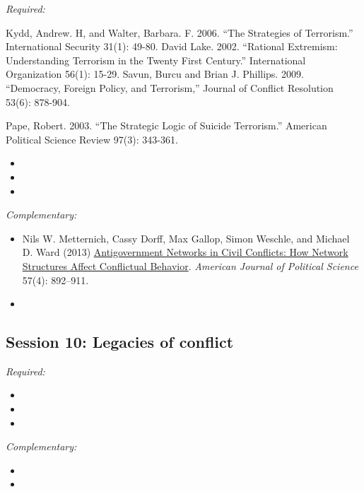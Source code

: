 \documentclass[12pt, a4paper]{article}
\begin{document}
\noindent\textit{Required:}


Kydd, Andrew. H, and Walter, Barbara. F. 2006. “The Strategies of Terrorism.” International Security 31(1): 49-80.
David Lake. 2002. “Rational Extremism: Understanding Terrorism in the Twenty First Century.” International Organization 56(1): 15-29.
Savun, Burcu and Brian J. Phillips. 2009. “Democracy, Foreign Policy, and Terrorism,” Journal of Conflict Resolution 53(6): 878-904.


Pape, Robert. 2003. “The Strategic Logic of Suicide Terrorism.” American Political Science Review 97(3): 343-361.


\begin{itemize}
  \item
  \item
  \item
\end{itemize}

\noindent\textit{Complementary:}

\begin{itemize}
  \item Nils W. Metternich, Cassy Dorff, Max Gallop, Simon Weschle, and Michael D. Ward (2013) \href{https://doi.org/10.1111/ajps.12039}{Antigovernment Networks in Civil Conflicts: How Network Structures Affect Conflictual Behavior}. \textit{American Journal of Political Science} 57(4): 892--911.
  \item
\end{itemize}

\vspace{20pt}
\hline
\subsection*{Session 10: Legacies of conflict}

\noindent\textit{Required:}

\begin{itemize}
  \item
  \item
  \item
\end{itemize}

\noindent\textit{Complementary:}

\begin{itemize}
  \item
  \item
\end{itemize}
\end{document}

